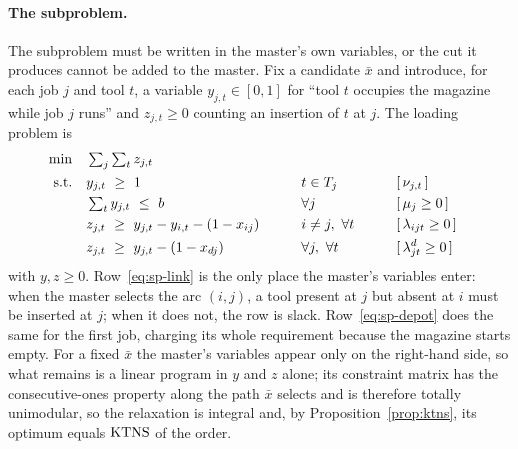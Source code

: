 \paragraph{The subproblem.}
The subproblem must be written in the master's own variables, or the cut it produces
cannot be added to the master. Fix a candidate $\bar{x}$ and introduce, for each job
$j$ and tool $t$, a variable $y_{j,t}\in[0,1]$ for ``tool $t$ occupies the magazine
while job $j$ runs'' and $z_{j,t}\ge0$ counting an insertion of $t$ at $j$. The loading
problem is
\begin{alignat}{3}
  \min\quad & \textstyle\sum_{j}\sum_{t} z_{j,t} \notag\\
  \text{s.t.}\quad
   & y_{j,t}\ \ge\ 1
     &\qquad& t\in T_j &\qquad& [\,\nu_{j,t}\,] \label{eq:sp-req}\\
   & \textstyle\sum_{t} y_{j,t}\ \le\ b
     && \forall j && [\,\mu_j\ge0\,] \label{eq:sp-cap}\\
   & z_{j,t}\ \ge\ y_{j,t}-y_{i,t}-(1-x_{ij})
     && i\ne j,\ \forall t && [\,\lambda_{ijt}\ge0\,] \label{eq:sp-link}\\
   & z_{j,t}\ \ge\ y_{j,t}-(1-x_{dj})
     && \forall j,\ \forall t && [\,\lambda^{d}_{jt}\ge0\,] \label{eq:sp-depot}
\end{alignat}
with $y,z\ge0$. Row~\eqref{eq:sp-link} is the only place the master's variables enter:
when the master selects the arc $(i,j)$, a tool present at $j$ but absent at $i$ must be
inserted at $j$; when it does not, the row is slack. Row~\eqref{eq:sp-depot} does the
same for the first job, charging its whole requirement because the magazine starts
empty. For a fixed $\bar x$ the master's variables appear only on the right-hand side,
so what remains is a linear program in $y$ and $z$ alone; its constraint matrix has the
consecutive-ones property along the path $\bar x$ selects and is therefore totally
unimodular, so the relaxation is integral and, by Proposition~\ref{prop:ktns}, its
optimum equals $\operatorname{KTNS}$ of the order.

